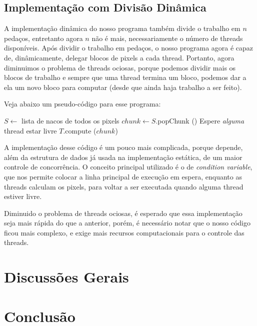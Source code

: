 \documentclass[12pt]{article}
\begin{document}
\subsection{Implementação com Divisão Dinâmica}
A implementação dinâmica do nosso programa também divide o trabalho em
$n$ pedaços, entretanto agora $n$ não é mais, necessariamente o número
de threads disponíveis. Após dividir o trabalho em pedaços, o nosso 
programa agora é capaz de, dinâmicamente, delegar blocos de pixels a 
cada thread. Portanto, agora diminuimos o problema de threads ociosas,
porque podemos dividir mais os blocos de trabalho e sempre que uma 
thread termina um bloco, podemos dar a ela um novo bloco para computar 
(desde que ainda haja trabalho a ser feito).

Veja abaixo um pseudo-código para esse programa:
\begin{algorithmic}[1]
    \State $S \gets $ lista de nacos de todos os pixels
        \State $chunk \gets S$.popChunk ()
        \State Espere {\em alguma} thread estar livre
                \State $T$.compute ($chunk$)
            \EndIf
        \EndFor
    \EndWhile 
    \EndFunction
\end{algorithmic}


A implementação desse código é um pouco mais complicada, porque depende,
além da estrutura de dados já usada na implementação estática, de um 
maior controle de concorrência. O conceito principal utilizado é o de 
{\em condition variable}, que nos permite colocar a linha principal de
execução em espera, enquanto as threads calculam os pixels, para voltar
a ser executada quando alguma thread estiver livre.

Diminuido o problema de threads ociosas, é esperado que essa 
implementação seja mais rápida do que a anterior, porém, é necessário 
notar que o nosso código ficou mais complexo, e exige mais recursos
computacionais para o controle das threads.
\newpage

\newpage
\section{Discussões Gerais}
\newpage

\newpage
\section{Conclusão}
\newpage
\end{document}
